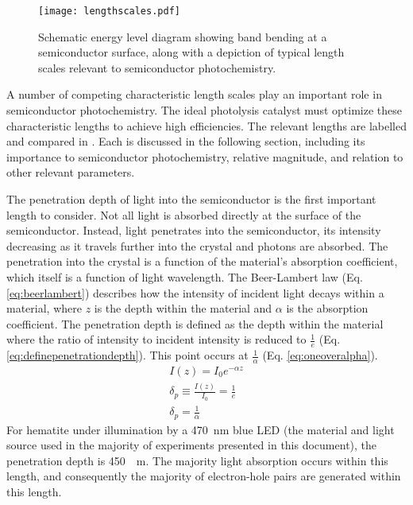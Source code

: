 \begin{figure}
	\centering
	\texttt{[image: lengthscales.pdf]}
	\caption[Band bending at semiconductor surface]{%
		Schematic energy level diagram showing band bending at a 
		semiconductor surface, along with a depiction of typical length 
		scales relevant to semiconductor photochemistry.}
	\label{fig:lengthscales}
\end{figure}

A number of competing characteristic length scales play an important role 
in semiconductor photochemistry. The ideal photolysis catalyst must 
optimize these characteristic lengths to achieve high efficiencies. The 
relevant lengths are labelled and compared in . 
Each is discussed in the following section, including its importance to 
semiconductor photochemistry, relative magnitude, and relation to other 
relevant parameters.

The penetration depth of light into the semiconductor is the first 
important length to consider. Not all light is absorbed directly at the 
surface of the semiconductor. Instead, light penetrates into the 
semiconductor, its intensity decreasing as it travels further into the 
crystal and photons are absorbed. The penetration into the crystal is a 
function of the material's absorption coefficient, which itself is a 
function of light wavelength. The Beer-Lambert law (Eq. 
\ref{eq:beerlambert}) describes how the intensity of incident light decays 
within a material, where $z$ is the depth within the material and $\alpha$ 
is the absorption coefficient. The penetration depth is defined as the 
depth within the material where the ratio of intensity to incident 
intensity is reduced to  $\frac{1}{e}$ (Eq. 
\ref{eq:definepenetrationdepth}). This point occurs at $\frac{1}{\alpha}$ 
(Eq. \ref{eq:oneoveralpha}).
\begin{gather}

	\label{eq:beerlambert}
	I(z)=I_{0}e^{-\alpha z}\\
	
	\label{eq:definepenetrationdepth}
	\delta_{p} \equiv \frac{I(z)}{I_{0}}=\frac{1}{e}\\
	
	\label{eq:oneoveralpha}
	\delta_{p} = \frac{1}{\alpha}
	
\end{gather}
For hematite under illumination by a \SI{470}{\nano\meter} blue LED (the 
material and light source used in the majority of experiments presented in 
this document), the penetration depth is \texttildelow\SI{450}{\nano%
\meter}.\cite{Marusak:1980gc} The majority light absorption occurs within 
this length, and consequently the majority of electron-hole pairs are 
generated within this length.

